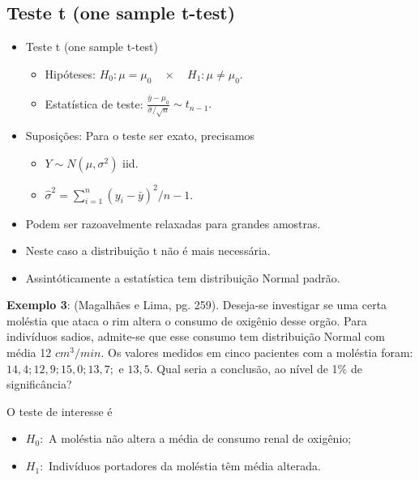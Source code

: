 \documentclass[
  10pt,
  a4paper]{book}
\providecommand{\tightlist}{%
  \setlength{\itemsep}{0pt}\setlength{\parskip}{0pt}}
\begin{document}
\hypertarget{teste-t-one-sample-t-test}{%
\subsection{Teste t (one sample t-test)}\label{teste-t-one-sample-t-test}}

\begin{itemize}
\tightlist
\item
  Teste t (one sample t-test)

  \begin{itemize}
  \tightlist
  \item
    Hipóteses: \(H_0: \mu = \mu_0 \quad \times \quad H_1: \mu \neq \mu_0.\)
  \item
    Estatística de teste: \(\frac{\bar{y} - \mu_0}{\hat{\sigma}/\sqrt{n}} \sim t_{n-1}.\)
  \end{itemize}
\item
  Suposições: Para o teste ser exato, precisamos

  \begin{itemize}
  \tightlist
  \item
    \(Y \sim N(\mu, \sigma^2)\) iid.
  \item
    \(\hat{\sigma}^2 = \sum_{i=1}^n (y_i - \bar{y})^2/n-1\).
  \end{itemize}
\item
  Podem ser razoavelmente relaxadas para grandes amostras.
\item
  Neste caso a distribuição t não é mais necessária.
\item
  Assintóticamente a estatística tem distribuição Normal padrão.
\end{itemize}

\textbf{Exemplo 3}: (Magalhães e Lima, pg. 259). Deseja-se investigar se uma certa moléstia que ataca o rim altera o consumo de oxigênio desse orgão. Para indivíduos sadios, admite-se que esse consumo tem distribuição Normal com média 12 \(cm^3/min\). Os valores medidos em cinco pacientes com a moléstia foram: \(14,4;12,9;15,0;13,7;\) e \(13,5\). Qual seria a conclusão, ao nível de 1\(\%\) de significância?

O teste de interesse é

\begin{itemize}
\tightlist
\item
  \(H_0:\) A moléstia não altera a média de consumo renal de oxigênio;
\item
  \(H_1:\) Indivíduos portadores da moléstia têm média alterada.
\end{itemize}
\end{document}
